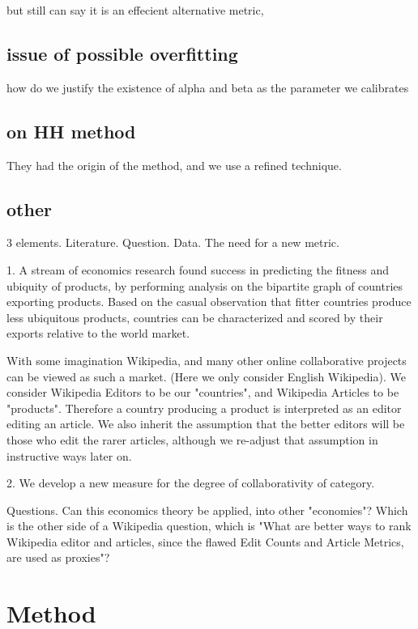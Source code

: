 \documentclass{acm_proc_article-sp}
\begin{document}
but still can say it is an effecient alternative metric, 

\subsection{issue of possible overfitting}
how do we justify the existence of alpha and beta as the parameter we calibrates

\subsection{ on HH method}
They had the origin of the method, and we use a refined technique.

\subsection{other}


3 elements. Literature. Question. Data. The need for a new metric.

1. A stream of economics research found success in predicting the fitness and ubiquity of products, by performing analysis on the bipartite graph of countries exporting products. Based on the casual observation that fitter countries produce less ubiquitous products, countries can be characterized and scored by their exports relative to the world market.

With some imagination Wikipedia, and many other online collaborative projects can be viewed as such a market. (Here we only consider English Wikipedia). We consider Wikipedia Editors to be our "countries", and Wikipedia Articles to be "products". Therefore a country producing a product is interpreted as an editor editing an article. We also inherit the assumption that the better editors will be those who edit the rarer articles, although we re-adjust that assumption in instructive ways later on. 


2. We develop a new measure for the degree of collaborativity of category.

Questions. Can this economics theory be applied, into other "economies"? Which is the other side of a Wikipedia question, which is "What are better ways to rank Wikipedia editor and articles, since the flawed Edit Counts and Article Metrics, are used as proxies"?



 

\section{Method}
\end{document}
